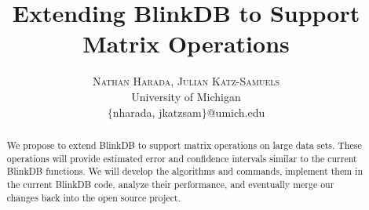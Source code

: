 \documentclass[twoside]{article}
\title{\vspace{-15mm}\fontsize{24pt}{10pt}\selectfont\textbf{Extending BlinkDB to Support Matrix Operations}} %
\author{
\large
\textsc{Nathan Harada, Julian Katz-Samuels}\\[2mm] %
\normalsize University of Michigan \\ %
\normalsize $\{$nharada, jkatzsam$\}$@umich.edu
\vspace{-5mm}
}
\date{}
\begin{document}
\maketitle %

\thispagestyle{fancy} %


\begin{abstract}

We propose to extend BlinkDB to support matrix operations on large data sets. These operations will provide estimated error and confidence intervals similar to the current BlinkDB functions. We will develop the algorithms and commands, implement them in the current BlinkDB code, analyze their performance, and eventually merge our changes back into the open source project.

\end{abstract}

\end{document}

